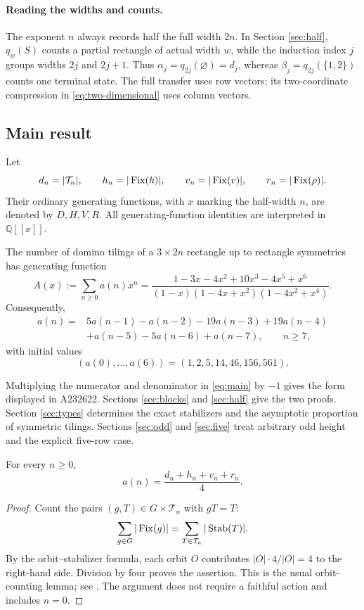 \paragraph{Reading the widths and counts.}
The exponent $n$ always records half the full width $2n$.
In Section \ref{sec:half}, $q_w(S)$ counts a partial rectangle of
actual width $w$, while the induction index $j$ groups widths $2j$
and $2j+1$. Thus $\alpha_j=q_{2j}(\varnothing)=d_j$, whereas
$\beta_j=q_{2j}(\{1,2\})$ counts one terminal state.
The full transfer uses row vectors; its two-coordinate compression
in \eqref{eq:two-dimensional} uses column vectors.

\subsection{Main result}
Let
\[
 d_n=|\mathcal T_n|,\qquad h_n=|\operatorname{Fix}(h)|,\qquad
 v_n=|\operatorname{Fix}(v)|,\qquad r_n=|\operatorname{Fix}(\rho)|.
\]
Their ordinary generating functions, with $x$ marking the
half-width $n$, are denoted by $D,H,V,R$.
All generating-function identities are interpreted in
$\mathbb Q[[x]]$.

\begin{theorem}\label{thm:main}
The number of domino tilings of a $3\times2n$ rectangle up to
rectangle symmetries has generating function
\begin{equation}\label{eq:main}
 A(x):=\sum_{n\ge0}a(n)x^n
 =\frac{1-3x-4x^2+10x^3-4x^5+x^6}
 {(1-x)(1-4x+x^2)(1-4x^2+x^4)}.
\end{equation}
Consequently,
\begin{equation}\label{eq:recurrence}
\begin{split}
a(n)={}&5a(n-1)-a(n-2)-19a(n-3)+19a(n-4)\\
       &+a(n-5)-5a(n-6)+a(n-7),\qquad n\ge7,
\end{split}
\end{equation}
with initial values
\[
 (a(0),\ldots,a(6))=(1,2,5,14,46,156,561).
\]
\end{theorem}

Multiplying the numerator and denominator in \eqref{eq:main} by
$-1$ gives the form displayed in A232622.
Sections \ref{sec:blocks} and \ref{sec:half} give the two proofs.
Section \ref{sec:types} determines the exact stabilizers and the
asymptotic proportion of symmetric tilings.
Sections \ref{sec:odd} and \ref{sec:five} treat arbitrary odd height
and the explicit five-row case.

\begin{lemma}\label{lem:burnside}
For every $n\ge0$,
\begin{equation}\label{eq:burnside}
 a(n)=\frac{d_n+h_n+v_n+r_n}{4}.
\end{equation}
\end{lemma}
\begin{proof}
Count the pairs $(g,T)\in G\times\mathcal T_n$ with $gT=T$:
\[
 \sum_{g\in G}|\operatorname{Fix}(g)|
 =\sum_{T\in\mathcal T_n}|\operatorname{Stab}(T)|.
\]
By the orbit--stabilizer formula, each orbit $O$ contributes
$|O|\cdot4/|O|=4$ to the right-hand side.
Division by four proves the assertion.
This is the usual orbit-counting lemma; see
\cite[Chapter 7, Lemma 7.2]{stanley}.
The argument does not require a faithful action and includes $n=0$.
\end{proof}
